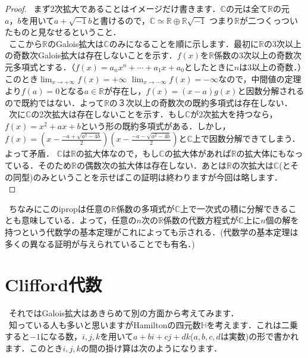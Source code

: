 \documentclass[./main]{subfiles} %
\theoremstyle{idefinition}
\begin{document}
\begin{proof}
\ まず2次拡大であることはイメージだけ書きます．$\mathbb{C}$の元は全て$\mathbb{R}$の元$a，b$を用いて$a+\sqrt{-1} b$と書けるので，$\mathbb{C} \simeq \mathbb{R} \oplus \mathbb{R} \sqrt{-1}$ つまり$\mathbb{R}$が二つくっついたものと見なせるということ．\\
\ ここから$\mathbb{R}$のGalois拡大は$\mathbb{C}$のみになることを順に示します．最初に$\mathbb{R}$の3次以上の奇数次Galois拡大は存在しないことを示す．$f(x)$を$\mathbb{R}$係数の3次以上の奇数次元多項式とする．（$f(x)=a_nx^n+\cdots +a_1x+a_0$としたときに$n$は3以上の奇数．）このとき$\displaystyle \lim_{x \to +\infty} f(x)=+\infty$ $\displaystyle \lim_{x \to -\infty} f(x)=-\infty$なので，中間値の定理より$f(a)=0$となる$a\in \mathbb{R}$が存在し，$f(x)=(x-a)g(x)$と因数分解されるので既約ではない．よって$\mathbb{R}$の３次以上の奇数次の既約多項式は存在しない．\\
\ 次に$\mathbb{C}$の2次拡大は存在しないことを示す．もし$\mathbb{C}$が2次拡大を持つなら，$f(x)=x^2+ax+b$という形の既約多項式がある．しかし，$f(x)=(x-\frac{-a+\sqrt{a^2-4b}}{2})(x-\frac{-a-\sqrt{a^2-4b}}{2})$と$\mathbb{C}$上で因数分解できてしまう．よって矛盾． $\mathbb{C}$は$\mathbb{R}$の拡大体なので，もし$\mathbb{C}$の拡大体があれば$\mathbb{R}$の拡大体にもなっている．そのため$\mathbb{R}$の偶数次の拡大体は存在しない．あとは$\mathbb{R}$の次拡大は$\mathbb{C}$(とその同型)のみということを示せばこの証明は終わりますが今回は略します．\\
\end{proof}

\ ちなみにこのipropは任意の$\mathbb{R}$係数の多項式が$\mathbb{C}$上で一次式の積に分解できることも意味している．よって，任意の$n$次の$\mathbb{R}$係数の代数方程式が$\mathbb{C}$上に$n$個の解を持つという代数学の基本定理がこれによっても示される．(代数学の基本定理は多くの異なる証明が与えられていることでも有名．)\\


\newpage

\section{Clifford代数}

\ それではGalois拡大はあきらめて別の方面から考えてみます．\\
\ 知っている人も多いと思いますがHamiltonの四元数$\mathbb{H}$を考えます．これは二乗すると$-1$になる数，$i,j,k$を用いて$a+bi+cj+dk$($a,b,c,d$は実数)の形で書かれます．このとき$i,j,k$の間の掛け算は次のようになります．\\
\end{document}
